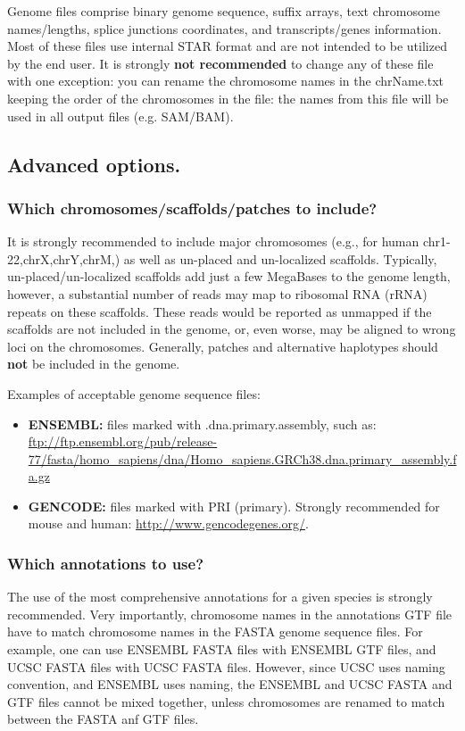 \documentclass[12pt]{article}
\begin{document}
Genome files comprise binary genome sequence, suffix arrays, text chromosome names/lengths, splice junctions coordinates, and transcripts/genes information. Most of these files use internal STAR format and are not intended to be utilized by the end user. It is strongly \textbf{not recommended} to change any of these file with one exception: you can rename the chromosome names in the chrName.txt keeping the order of the chromosomes in the file: the names from this file will be used in all output files (e.g. SAM/BAM).

\subsection{Advanced options.}
\subsubsection{Which chromosomes/scaffolds/patches to include?}
It is strongly recommended to include major chromosomes (e.g., for human chr1-22,chrX,chrY,chrM,) as well as un-placed and un-localized scaffolds. Typically, un-placed/un-localized scaffolds add just a few MegaBases to the genome length, however, a substantial number of reads may map to ribosomal RNA (rRNA) repeats on these scaffolds. These reads would be reported as unmapped if the scaffolds are not included in the genome, or, even worse, may be aligned to wrong loci on the chromosomes. Generally, patches and alternative haplotypes should \textbf{not} be included in the genome.

Examples of acceptable genome sequence files:
\begin{itemize}
\item \textbf{ENSEMBL:} files marked with .dna.primary.assembly, such as:
\url{ftp://ftp.ensembl.org/pub/release-77/fasta/homo_sapiens/dna/Homo_sapiens.GRCh38.dna.primary_assembly.fa.gz}
\item \textbf{GENCODE:} files marked with PRI (primary). Strongly recommended for mouse and human: \url{http://www.gencodegenes.org/}. 
\end{itemize} 
\subsubsection{Which annotations to use?}
The use of the most comprehensive annotations for a given species is strongly recommended. Very importantly, chromosome names in the annotations GTF file have to match chromosome names in the FASTA genome sequence files. For example, one can use ENSEMBL FASTA files with ENSEMBL GTF files, and UCSC FASTA files with UCSC FASTA files. However, since UCSC uses  naming convention, and ENSEMBL uses  naming, the ENSEMBL and UCSC FASTA and GTF files cannot be mixed together, unless chromosomes are  renamed to match between the FASTA anf GTF files.
\end{document}
